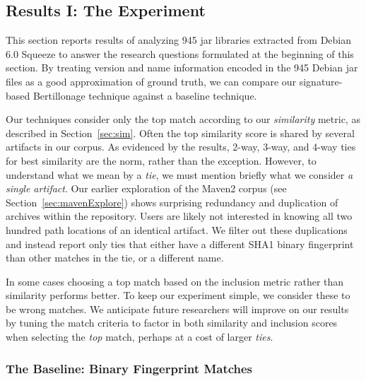 \subsection{Results I:  The Experiment}

\label{sec:results}

This section reports results of analyzing 945 jar libraries extracted from
Debian 6.0 Squeeze to answer the research questions formulated 
at the beginning of this section.
By treating version and name information encoded
in the 945 Debian jar files as a good approximation of ground truth, we can
compare our signature-based Bertillonage technique against a baseline
technique.

Our techniques consider only the top match according to our
\emph{similarity} metric, as described in Section~\ref{sec:sim}.  Often the
top similarity score is shared by several artifacts in our corpus.  As
evidenced by the results, 2-way, 3-way, and 4-way ties for best similarity are the
norm, rather than the exception.  However, to understand what we mean by a
\emph{tie}, we must mention briefly what we consider \emph{a single
artifact}.  Our earlier exploration of the Maven2 corpus (see
Section~\ref{sec:mavenExplore}) shows surprising redundancy and duplication
of archives within the repository.  Users are likely not interested in knowing all two hundred
path locations of an identical artifact.  We filter out these duplications
and instead report only ties that either have a different SHA1 binary
fingerprint than other matches in the tie, or a different name.  

In some cases choosing a top match based on the inclusion metric rather
than similarity performs better.  To keep our experiment simple, we
consider these to be wrong matches.  We anticipate future researchers
will improve on our results by tuning the match criteria to factor in
both similarity and inclusion scores when selecting the \emph{top} match,
perhaps at a cost of larger \emph{ties}.


\subsubsection{The Baseline:  Binary Fingerprint Matches}

